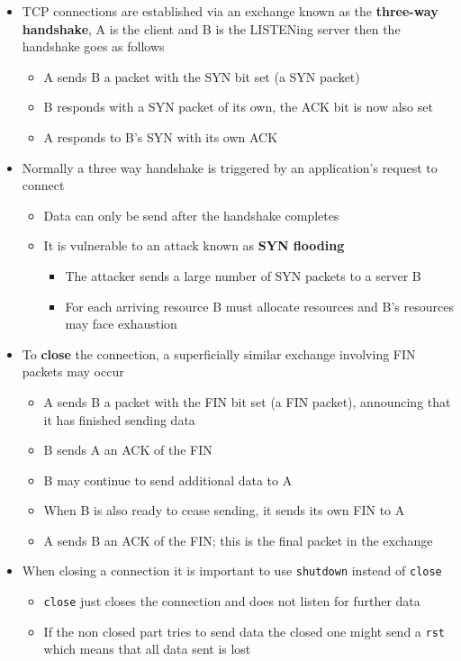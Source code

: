 \documentclass[11pt]{article}
\providecommand{\tightlist}{%
      \setlength{\itemsep}{0pt}\setlength{\parskip}{0pt}}
\begin{document}
\begin{itemize}
\tightlist
\item
  TCP connections are established via an exchange known as the
  \textbf{three-way handshake}, A is the client and B is the LISTENing
  server then the handshake goes as follows

  \begin{itemize}
  \tightlist
  \item
    A sends B a packet with the SYN bit set (a SYN packet)
  \item
    B responds with a SYN packet of its own, the ACK bit is now also set
  \item
    A responds to B's SYN with its own ACK
  \end{itemize}
\item
  Normally a three way handshake is triggered by an application's
  request to connect

  \begin{itemize}
  \tightlist
  \item
    Data can only be send after the handshake completes
  \item
    It is vulnerable to an attack known as \textbf{SYN flooding}

    \begin{itemize}
    \tightlist
    \item
      The attacker sends a large number of SYN packets to a server B
    \item
      For each arriving resource B must allocate resources and B's
      resources may face exhaustion
    \end{itemize}
  \end{itemize}
\item
  To \textbf{close} the connection, a superficially similar exchange
  involving FIN packets may occur

  \begin{itemize}
  \tightlist
  \item
    A sends B a packet with the FIN bit set (a FIN packet), announcing
    that it has finished sending data
  \item
    B sends A an ACK of the FIN
  \item
    B may continue to send additional data to A
  \item
    When B is also ready to cease sending, it sends its own FIN to A
  \item
    A sends B an ACK of the FIN; this is the final packet in the
    exchange
  \end{itemize}
\item
  When closing a connection it is important to use \texttt{shutdown}
  instead of \texttt{close}

  \begin{itemize}
  \tightlist
  \item
    \texttt{close} just closes the connection and does not listen for
    further data
  \item
    If the non closed part tries to send data the closed one might send
    a \texttt{rst} which means that all data sent is lost
  \end{itemize}
\end{itemize}
\end{document}
